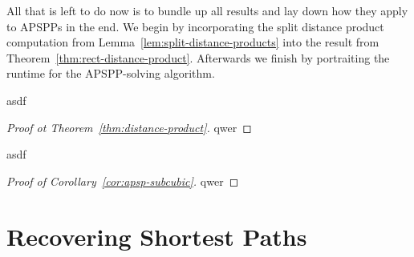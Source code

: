 All that is left to do now is to bundle up all results and lay down how they apply to APSPPs in the end.
We begin by incorporating the split distance product computation from Lemma~\ref{lem:split-distance-products} into the result from Theorem~\ref{thm:rect-distance-product}.
Afterwards we finish by portraiting the runtime for the APSPP-solving algorithm.

\begin{theorem}\label{thm:distance-product}
    asdf
\end{theorem}

\begin{proof}[Proof ot Theorem~\ref{thm:distance-product}]
    qwer
\end{proof}

\begin{corollary}\label{cor:apsp-subcubic}
    asdf
\end{corollary}

\begin{proof}[Proof of Corollary~\ref{cor:apsp-subcubic}]
    qwer
\end{proof}

\section{Recovering Shortest Paths}\label{sec:recovery}

